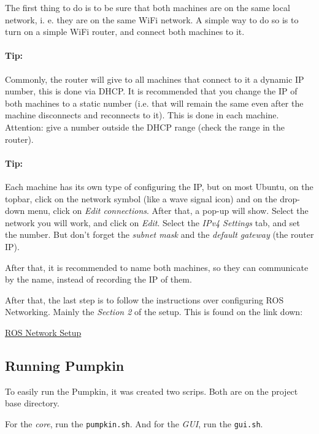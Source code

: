 \documentclass[oneside,a4paper,titlepage]{article}
\begin{document}
The first thing to do is to be sure that both machines are on the same local network, i. e. they are on the same WiFi network. A simple way to do so is to turn on a simple WiFi router, and connect both machines to it.

\paragraph{Tip: } Commonly, the router will give to all machines that connect to it a dynamic IP number, this is done via DHCP. It is recommended that you change the IP of both machines to a static number (i.e. that will remain the same even after the machine disconnects and reconnects to it). This is done in each machine. {\color{red}Attention: } give a number outside the DHCP range (check the range in the router).

\paragraph{Tip: }Each machine has its own type of configuring the IP, but on most Ubuntu, on the topbar, click on the network symbol (like a wave signal icon) and on the drop-down menu, click on \emph{Edit connections}. After that, a pop-up will show. Select the network you will work, and click on \emph{Edit}. Select the \emph{IPv4 Settings} tab, and set the number. But don't forget the \emph{subnet mask} and the \emph{default gateway} (the router IP).

After that, it is recommended to name both machines, so they can communicate by the name, instead of recording the IP of them.

After that, the last step is to follow the instructions over configuring ROS Networking. Mainly the \emph{Section 2} of the setup. This is found on the link down:

\begin{center}
\href{http://wiki.ros.org/ROS/NetworkSetup}{ROS Network Setup}
\end{center}

\subsection{Running Pumpkin}
\label{sec:run}
To easily run the Pumpkin, it was created two scrips. Both are on the project base directory.

For the \emph{core}, run the \texttt{pumpkin.sh}. And for the \emph{GUI}, run the \texttt{gui.sh}.
\end{document}
